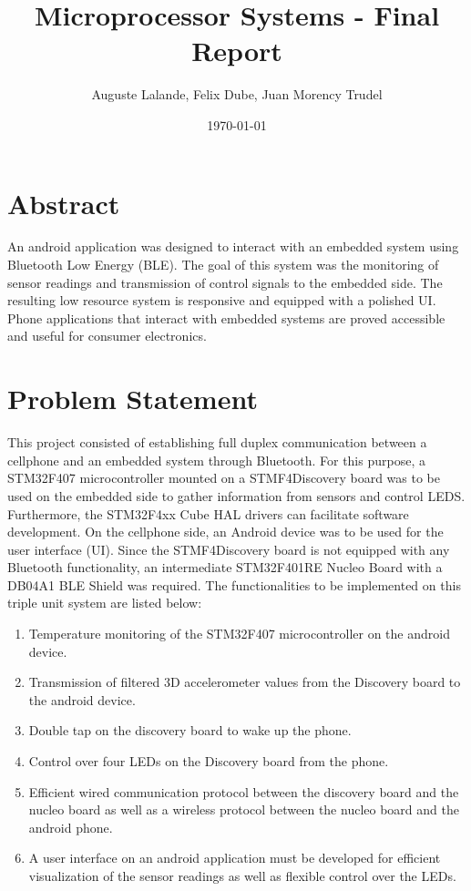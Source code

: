 \documentclass[12pt]{article}
\title{Microprocessor Systems - Final Report}
\author{Auguste Lalande, Felix Dube, Juan Morency Trudel}
\date{\today}
\begin{document}
\maketitle
\clearpage

\tableofcontents
\clearpage

\section{Abstract}
An android application was designed to interact with an embedded system using Bluetooth Low Energy (BLE). The goal of this system was the monitoring of sensor readings and transmission of control signals to the embedded side. The resulting low resource system is responsive and equipped with a polished UI. Phone applications that interact with embedded systems are proved accessible and useful for consumer electronics.
\section{Problem Statement}
This project consisted of establishing full duplex communication between a cellphone and an embedded system through Bluetooth. For this purpose, a STM32F407 microcontroller mounted on a STMF4Discovery board was to be used on the embedded side to gather information from sensors and control LEDS. Furthermore, the STM32F4xx Cube HAL drivers can facilitate software development. On the cellphone side, an Android device was to be used for the user interface (UI). Since the STMF4Discovery board is not equipped with any Bluetooth functionality, an intermediate STM32F401RE Nucleo Board with a DB04A1 BLE Shield was required. The functionalities to be implemented on this triple unit system are listed below:

\begin{enumerate}
\item Temperature monitoring of the STM32F407 microcontroller on the android device.
\item Transmission of filtered 3D accelerometer values from the Discovery board to the android device.
\item Double tap on the discovery board to wake up the phone.
\item Control over four LEDs on the Discovery board from the phone.
\item Efficient wired communication protocol between the discovery board and the nucleo board as well as a wireless protocol between the nucleo board and the android phone.
\item A user interface on an android application must be developed for efficient visualization of the sensor readings as well as flexible control over the LEDs.
\end{enumerate}
\end{document}
